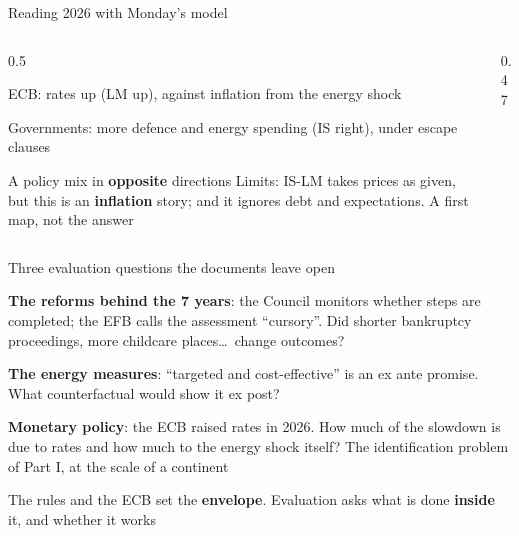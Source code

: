 \documentclass[aspectratio=169,xcolor=table]{beamer}
\begin{document}
\begin{frame}{Reading 2026 with Monday's model}
\begin{columns}[c]
\begin{column}{0.5\textwidth}
\small
\bi
  \item ECB: rates up (LM up), against inflation from the energy shock
  \item Governments: more defence and energy spending (IS right), under escape clauses
  \item A policy mix in \textbf{opposite} directions
\ei
\vspace{0.1cm}
\footnotesize
Limits: IS-LM takes prices as given, but this is an \textbf{inflation} story; and it ignores debt and expectations. A first map, not the answer
\end{column}
\begin{column}{0.47\textwidth}
\centering
{}
\end{column}
\end{columns}
\end{frame}

\begin{frame}{Three evaluation questions the documents leave open}
\small
\be
  \item \textbf{The reforms behind the 7 years}: the Council monitors whether steps are completed; the EFB calls the assessment ``cursory''. Did shorter bankruptcy proceedings, more childcare places\ldots\ change outcomes?
  \item \textbf{The energy measures}: ``targeted and cost-effective'' is an ex ante promise. What counterfactual would show it ex post?
  \item \textbf{Monetary policy}: the ECB raised rates in 2026. How much of the slowdown is due to rates and how much to the energy shock itself? The identification problem of Part I, at the scale of a continent
\ee
\vspace{0.15cm}
\begin{block}{}
\centering The rules and the ECB set the \textbf{envelope}. Evaluation asks what is done \textbf{inside} it, and whether it works
\end{block}
\end{frame}
\end{document}
